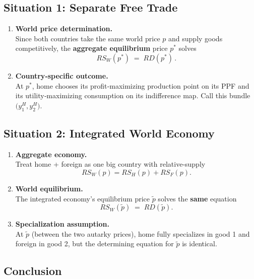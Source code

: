 \documentclass[
]{article}
\providecommand{\tightlist}{%
  \setlength{\itemsep}{0pt}\setlength{\parskip}{0pt}}
\begin{document}
\subsection{Situation 1: Separate Free
Trade}\label{situation-1-separate-free-trade}

\begin{enumerate}
\def\labelenumi{\arabic{enumi}.}
\tightlist
\item
  \textbf{World price determination.}\\
  Since both countries take the same world price \(p\) and supply goods
  competitively, the \textbf{aggregate equilibrium} price \(p^*\) solves
  \[
  RS_W(p^*) \;=\; RD(p^*)\,.
  \]
\item
  \textbf{Country‐specific outcome.}\\
  At \(p^*\), home chooses its profit‐maximizing production point on its
  PPF and its utility‐maximizing consumption on its indifference map.
  Call this bundle \(\bigl(y_1^H,y_2^H\bigr)\).
\end{enumerate}

\subsection{Situation 2: Integrated World
Economy}\label{situation-2-integrated-world-economy}

\begin{enumerate}
\def\labelenumi{\arabic{enumi}.}
\tightlist
\item
  \textbf{Aggregate economy.}\\
  Treat home + foreign as one big country with relative‐supply\\
  \[
    RS_W(p)=RS_H(p)+RS_F(p).
  \]
\item
  \textbf{World equilibrium.}\\
  The integrated economy's equilibrium price \(\tilde p\) solves the
  \textbf{same} equation \[
  RS_W(\tilde p) \;=\; RD(\tilde p).
  \]
\item
  \textbf{Specialization assumption.}\\
  At \(\tilde p\) (between the two autarky prices), home fully
  specializes in good 1 and foreign in good 2, but the determining
  equation for \(\tilde p\) is identical.
\end{enumerate}

\subsection{Conclusion}\label{conclusion}
\end{document}
